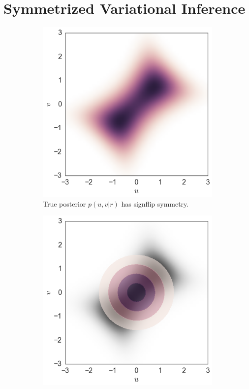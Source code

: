 \documentclass{article}
\begin{document}
\section{Symmetrized Variational Inference}
\vspace{-0.5em}
\begin{figure}[t]
\centering
\begin{subfigure}[t]{.3\textwidth}
\includegraphics[width=\textwidth]{signflip_bayes_posterior}
\caption{True posterior $p(u, v | r)$ has signflip symmetry.}
\end{subfigure}
\begin{subfigure}[t]{.3\textwidth}
\includegraphics[width=\textwidth]{signflip_mfvb_posterior}

\end{subfigure}
\end{figure}
\end{document}
